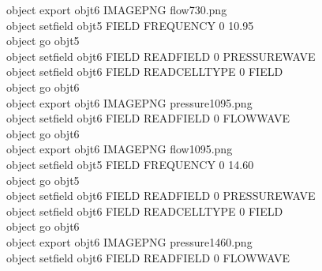 \documentclass[a4paper,12pt]{monografia}
\theoremstyle{plain}
\theoremstyle{definition}
\theoremstyle{remark}
\begin{document}
\begin{appendices}
\newpage
\begin{algorithm}[H]
	\SetAlgoLined
		object export obj\underline{\space\space}t6 IMAGE\underline{\space\space}PNG flow\underline{\space\space}7\underline{\space\space}30.png \\
		object set\underline{\space\space}field obj\underline{\space\space}t5 FIELD FREQUENCY 0 10.95 \\
		object go obj\underline{\space\space}t5 \\
		object set\underline{\space\space}field obj\underline{\space\space}t6 FIELD READ\underline{\space\space}FIELD 0 PRESSURE\underline{\space\space}WAVE \\
		object set\underline{\space\space}field obj\underline{\space\space}t6 FIELD READ\underline{\space\space}CELL\underline{\space\space}TYPE 0 FIELD \\
		object go obj\underline{\space\space}t6 \\
		object export obj\underline{\space\space}t6 IMAGE\underline{\space\space}PNG pressure\underline{\space\space}10\underline{\space\space}95.png \\
		object set\underline{\space\space}field obj\underline{\space\space}t6 FIELD READ\underline{\space\space}FIELD 0 FLOW\underline{\space\space}WAVE \\
		object go obj\underline{\space\space}t6 \\
		object export obj\underline{\space\space}t6 IMAGE\underline{\space\space}PNG flow\underline{\space\space}10\underline{\space\space}95.png \\
		object set\underline{\space\space}field obj\underline{\space\space}t5 FIELD FREQUENCY 0 14.60 \\
		object go obj\underline{\space\space}t5 \\
		object set\underline{\space\space}field obj\underline{\space\space}t6 FIELD READ\underline{\space\space}FIELD 0 PRESSURE\underline{\space\space}WAVE \\
		object set\underline{\space\space}field obj\underline{\space\space}t6 FIELD READ\underline{\space\space}CELL\underline{\space\space}TYPE 0 FIELD \\
		object go obj\underline{\space\space}t6 \\
		object export obj\underline{\space\space}t6 IMAGE\underline{\space\space}PNG pressure\underline{\space\space}14\underline{\space\space}60.png \\
		object set\underline{\space\space}field obj\underline{\space\space}t6 FIELD READ\underline{\space\space}FIELD 0 FLOW\underline{\space\space}WAVE \\

\end{algorithm}
\end{appendices}
\end{document}
